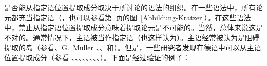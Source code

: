     是否能从指定语位置提取成分取决于所讨论的语法的组织。在一些语法中，所有论元都充当指定语（\citealp[--123]{Kratzer96a}，也可以参看第~\pageref{Abbildung-Kratzer}页的图~\ref{Abbildung-Kratzer}）。在这些语法中，禁止从指定语位置提取成分意味着提取论元是不可能的。当然，总体来说这是不对的。通常情况下，主语被当作指定语（\citealp[]{FG2002a}也这样认为）。主语经常被认为是阻碍提取的岛（参看\citealp[, ]{Grewendorf89a}、G.\ Müller \citeyear[]{GMueller96b}、\citeyear[, ]{GMueller98a}、\citealp[]{Sabel99a}和\citealp[]{Fanselow2001a}）。但是，一些\label{page-extraction-out-of-subjects}研究者发现在德语中可以从主语位置提取成分（参看 \citealp[]{Duerscheid89a}、\citealp*[]{Haider93a}、\citealp{Pafel93b-u}、\citealp[]{Fortmann96a-u}、\citealp[]{Suchsland97a}、\citealp[]{VS98a}、\citealp[]{Ballweg97a}、\citealp[--101]{Mueller99a}、\citealp[]{deKuthy2002a}）。下面是经过验证的例子：%
